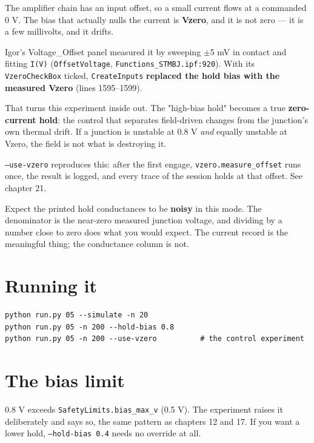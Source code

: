 The amplifier chain has an input offset, so a small current flows at a commanded 0 V. The bias that actually nulls the current is \textbf{Vzero}, and it is not zero --- it is a few millivolts, and it drifts.

Igor's Voltage\_Offset panel measured it by sweeping $\pm$5 mV in contact and fitting \texttt{I(V)} (\texttt{Offset\discretionary{}{}{}Voltage}, \texttt{Functions\_\discretionary{}{}{}STMBJ.\discretionary{}{}{}ipf:920}). With its \texttt{Vzero\discretionary{}{}{}Check\discretionary{}{}{}Box} ticked, \texttt{Create\discretionary{}{}{}Inputs} \textbf{replaced the hold bias with the measured Vzero} (lines 1595--1599).

That turns this experiment inside out. The "high-bias hold" becomes a true \textbf{zero-current hold}: the control that separates field-driven changes from the junction's own thermal drift. If a junction is unstable at 0.8 V \emph{and} equally unstable at Vzero, the field is not what is destroying it.

\texttt{--use-vzero} reproduces this: after the first engage, \texttt{vzero.\discretionary{}{}{}measure\_\discretionary{}{}{}offset} runs once, the result is logged, and every trace of the session holds at that offset. See chapter 21.

\begin{keybox}
Expect the printed hold conductances to be \textbf{noisy} in this mode. The denominator is the near-zero measured junction voltage, and dividing by a number close to zero does what you would expect. The current record is the meaningful thing; the conductance column is not.
\end{keybox}

\section{Running it}

\begin{lstlisting}[style=out]
python run.py 05 --simulate -n 20
python run.py 05 -n 200 --hold-bias 0.8
python run.py 05 -n 200 --use-vzero          # the control experiment
\end{lstlisting}

\section{The bias limit}

0.8 V exceeds \texttt{Safety\discretionary{}{}{}Limits.\discretionary{}{}{}bias\_\discretionary{}{}{}max\_\discretionary{}{}{}v} (0.5 V). The experiment raises it deliberately and says so, the same pattern as chapters 12 and 17. If you want a lower hold, \texttt{--hold-bias 0.\discretionary{}{}{}4} needs no override at all.

